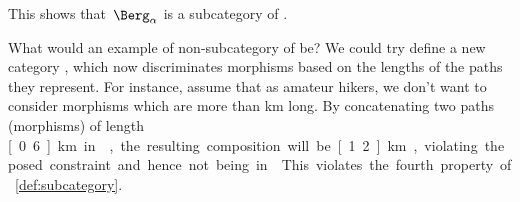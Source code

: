 This shows that~$\Berg_\alpha$ is a subcategory of \Berg.

What would an example of non-subcategory of \Berg be?
We could try define a new category \Berglazy, which now discriminates morphisms based on the lengths of the paths they represent.
For instance, assume that as amateur hikers, we don't want to consider morphisms which are more than \unit[1]{km} long.
By concatenating two paths (morphisms) of length \unit[0.6]{km} in \Berglazy, the resulting composition will be \unit[1.2]{km}, violating the posed constraint and hence not being in \Berglazy.
This violates the fourth property of \cref{def:subcategory}.









